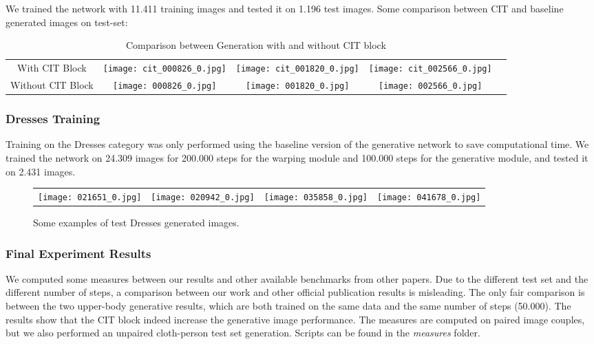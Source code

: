 We trained the network with 11.411 training images and tested it on 1.196 test images.
Some comparison between CIT and baseline generated images on test-set:

\begin{table}[h]
        \centering
        \begin{tabular}{ccccc}
            With CIT Block & \texttt{[image: cit\_000826\_0.jpg]} & \texttt{[image: cit\_001820\_0.jpg]} & \texttt{[image: cit\_002566\_0.jpg]} \\
            Without CIT Block & \texttt{[image: 000826\_0.jpg]} & \texttt{[image: 001820\_0.jpg]} & \texttt{[image: 002566\_0.jpg]}\\
        \end{tabular}
        \caption{Comparison between Generation with and without CIT block}
        \label{tbl:table_of_figures}
\end{table}


\subsubsection{Dresses Training}

Training on the Dresses category was only performed using the baseline version of the generative network to save computational time. We trained the network on 24.309 images for 200.000 steps for the warping module and 100.000 steps for the generative module, and tested it on 2.431 images.


\begin{figure}[h]
\centering
\begin{tabular}{cccc}
{\texttt{[image: 021651\_0.jpg]}} &
{\texttt{[image: 020942\_0.jpg]}} &
{\texttt{[image: 035858\_0.jpg]}} &
{\texttt{[image: 041678\_0.jpg]}} \\
\end{tabular}

\caption{Some examples of test Dresses generated images.}
\end{figure}



\subsubsection{Final Experiment Results}
We computed some measures between our results and other available benchmarks from other papers. Due to the different test set and the different number of steps, a comparison between our work and other official publication results is misleading. The only fair comparison is between the two upper-body generative results, which are both trained on the same data and the same number of steps (50.000). The results show that the CIT block indeed increase the generative image performance. The measures are computed on paired image couples, but we also performed an unpaired cloth-person test set generation. Scripts can be found in the \textit{measures} folder.


